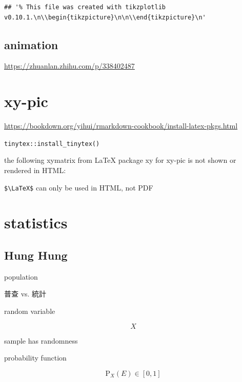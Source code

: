 \documentclass[
]{book}
\theoremstyle{definition}
\theoremstyle{definition}
\theoremstyle{definition}
\theoremstyle{definition}
\theoremstyle{remark}
\begin{document}
\begin{verbatim}
## '% This file was created with tikzplotlib v0.10.1.\n\\begin{tikzpicture}\n\n\\end{tikzpicture}\n'
\end{verbatim}

\section{animation}\label{animation}

\url{https://zhuanlan.zhihu.com/p/338402487}

\chapter{xy-pic}\label{xy-pic}

\url{https://bookdown.org/yihui/rmarkdown-cookbook/install-latex-pkgs.html}

\texttt{tinytex::install\_tinytex()}

the following xymatrix from LaTeX package xy for xy-pic is not shown or rendered in HTML:

\texttt{\$\textbackslash{}LaTeX\$} can only be used in HTML, not PDF


\chapter{statistics}\label{statistics}

\section{Hung Hung}\label{hung-hung}

population

\begin{CJK}{UTF8}{bsmi}
普查 vs. 統計
\end{CJK}

random variable

\[
X
\]

sample has randomness

probability function

\[
\mathrm{P}_{{\scriptscriptstyle X}}\left(E\right)\in\left[0,1\right]
\]
\end{document}
